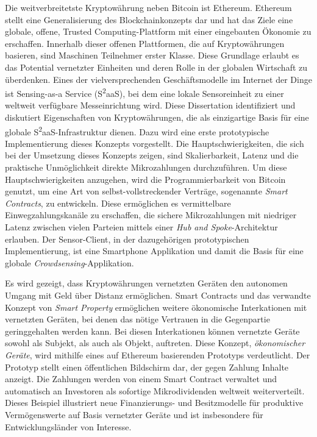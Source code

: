Die weitverbreitetste Kryptow{\"a}hrung neben Bitcoin ist Ethereum. Ethereum stellt eine Generalisierung des Blockchainkonzepts dar und hat das Ziele eine globale, offene, Trusted Computing-Plattform mit einer eingebauten {\"O}konomie zu erschaffen. Innerhalb dieser offenen Plattformen, die auf Kryptow{\"a}hrungen basieren, sind Maschinen Teilnehmer erster Klasse. Diese Grundlage erlaubt es das Potential vernetzter Einheiten und deren Rolle in der globalen Wirtschaft zu {\"u}berdenken. Eines der vielversprechenden Gesch{\"a}ftsmodelle im Internet der Dinge ist Sensing-as-a Service (S\textsuperscript{2}aaS), bei dem eine lokale Sensoreinheit zu einer weltweit verf{\"u}gbare Messeinrichtung wird.  Diese Dissertation identifiziert und diskutiert Eigenschaften von Kryptow{\"a}hrungen, die als einzigartige Basis für eine globale S\textsuperscript{2}aaS-Infrastruktur dienen. Dazu wird eine erste prototypische Implementierung dieses Konzepts vorgestellt. Die Hauptschwierigkeiten, die sich bei der Umsetzung dieses Konzepts zeigen, sind Skalierbarkeit, Latenz und die praktische Unm{\"o}glichkeit direkte Mikrozahlungen durchzuf{\"u}hren. Um diese Hauptschwierigkeiten anzugehen, wird die Programmierbarkeit von Bitcoin genutzt, um eine Art von selbst-vollstreckender Vertr{\"a}ge, sogenannte \emph{ Smart Contracts}, zu entwickeln.  Diese erm{\"o}glichen es vermittelbare Einwegzahlungskan{\"a}le zu erschaffen, die sichere Mikrozahlungen mit niedriger Latenz zwischen vielen Parteien mittels einer \emph{Hub and Spoke}-Architektur erlauben. Der Sensor-Client, in der dazugeh{\"o}rigen prototypischen Implementierung, ist eine Smartphone Applikation und damit die Basis für eine globale \emph{Crowdsensing}-Applikation.

Es wird gezeigt, dass Kryptow{\"a}hrungen vernetzten Ger{\"a}ten den autonomen Umgang mit Geld über Distanz erm{\"o}glichen. Smart Contracts und das verwandte Konzept von \emph{Smart Property} erm{\"o}glichen weitere {\"o}konomische Interkationen mit vernetzten Ger{\"a}ten, bei denen das n{\"o}tige Vertrauen in die Gegenpartie geringgehalten werden kann. Bei diesen Interkationen k{\"o}nnen vernetzte Ger{\"a}te sowohl als Subjekt, als auch als Objekt, auftreten.  Diese Konzept, \emph{{\"o}konomischer Ger{\"a}te}, wird mithilfe eines auf Ethereum basierenden Prototyps verdeutlicht. Der Prototyp stellt einen {\"o}ffentlichen Bildschirm dar, der gegen Zahlung Inhalte anzeigt. Die Zahlungen werden von einem Smart Contract verwaltet und automatisch an Investoren als sofortige Mikrodividenden weltweit weiterverteilt. Dieses Beispiel illustriert neue Finanzierungs- und Besitzmodelle für produktive Verm{\"o}genswerte auf Basis vernetzter Geräte und ist insbesondere für Entwicklungsl{\"a}nder von Interesse.







\endgroup

\vfill
